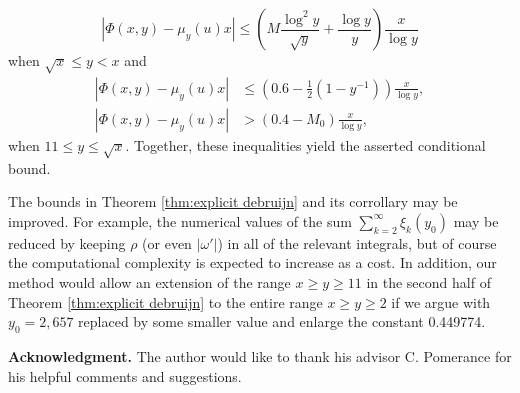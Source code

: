 \documentclass[12pt,reqno]{amsart}
\begin{document}
\[|\Phi(x,y)-\mu_y(u)x|\le\left(M\frac{\log^2y}{\sqrt{y}}+\frac{\log y}{y}\right)\frac{x}{\log y}\]
when $\sqrt{x}\le y<x$ and
\begin{align*}
|\Phi(x,y)-\mu_y(u)x|&\le\left(0.6-\frac{1}{2}\left(1-y^{-1}\right)\right)\frac{x}{\log y},\\
|\Phi(x,y)-\mu_y(u)x|&>(0.4-M_0)\frac{x}{\log y},
\end{align*}
when $11\le y\le\sqrt{x}$. Together, these inequalities yield the asserted conditional bound.

\begin{rmk}
The bounds in Theorem \ref{thm:explicit debruijn} and its corrollary may be improved. For example, the numerical values of the sum $\sum_{k=2}^{\infty}\xi_k(y_0)$ may be reduced by keeping $\rho$ (or even $|\omega'|$) in all of the relevant integrals, but of course the computational complexity is expected to increase as a cost. In addition, our method would allow an extension of the range $x\ge y\ge 11$ in the second half of Theorem \ref{thm:explicit debruijn} to the entire range $x\ge y\ge 2$ if we argue with $y_0=2{,}657$ replaced by some smaller value and enlarge the constant 0.449774.
\end{rmk}

{\noindent\bf Acknowledgment.} The author would like to thank his advisor C. Pomerance for his helpful comments and suggestions.

\medskip
\end{document}
